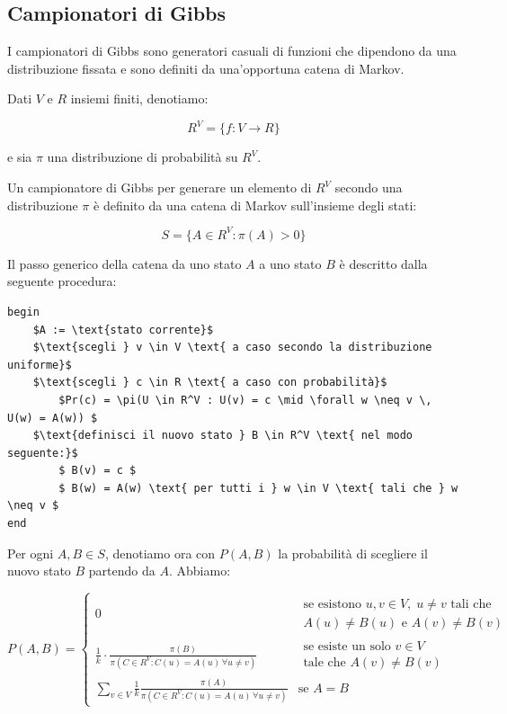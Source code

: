 \documentclass{article}
\begin{document}
\subsection{Campionatori di Gibbs}

I campionatori di Gibbs sono generatori casuali di funzioni che dipendono da una distribuzione fissata e sono definiti da una'opportuna catena di Markov.

Dati $ V $ e $ R $ insiemi finiti, denotiamo:

$$ R^V = \{ f : V \rightarrow R \} $$

e sia $ \pi $ una distribuzione di probabilità su $ R^V $.

Un campionatore di Gibbs per generare un elemento di $ R^V $ secondo una distribuzione $ \pi $ è definito da una catena di Markov sull’insieme degli stati:

$$ S = \{ A \in R^V : \pi(A) > 0 \} $$

Il passo generico della catena da uno stato $ A $ a uno stato $ B $ è descritto dalla seguente procedura:

\begin{lstlisting}
begin
    $A := \text{stato corrente}$
    $\text{scegli } v \in V \text{ a caso secondo la distribuzione uniforme}$
    $\text{scegli } c \in R \text{ a caso con probabilità}$
        $Pr(c) = \pi(U \in R^V : U(v) = c \mid \forall w \neq v \, U(w) = A(w)) $
    $\text{definisci il nuovo stato } B \in R^V \text{ nel modo seguente:}$
        $ B(v) = c $ 
        $ B(w) = A(w) \text{ per tutti i } w \in V \text{ tali che } w \neq v $
end
\end{lstlisting}


Per ogni $ A, B \in S $, denotiamo ora con $ P(A, B) $ la probabilità di scegliere il nuovo stato $ B $ partendo da $ A $. Abbiamo:


\begin{equation*}
    P(A, B) = \begin{cases}
0 & 
\begin{array}{c}
\text{se esistono }  u, v \in V, \; u \neq v \text{ tali che } \\
A(u) \neq B(u) \text{ e } A(v) \neq B(v)
\end{array} \\
\frac{1}{k} \cdot \frac{\pi(B)}{\pi\left(C \in R^V : C(u) = A(u) \, \forall u \neq v \right)} & \begin{array}{c}
\text{se esiste un solo } v \in V \\
\text{tale che } A(v) \neq B(v)
\end{array}
\\
\sum_{v \in V} \frac{1}{k}  \frac{\pi(A)}{\pi\left(C \in R^V : C(u) = A(u) \, \forall u \neq v \right)} & \text{se } A = B
\end{cases}
\end{equation*}
\end{document}
